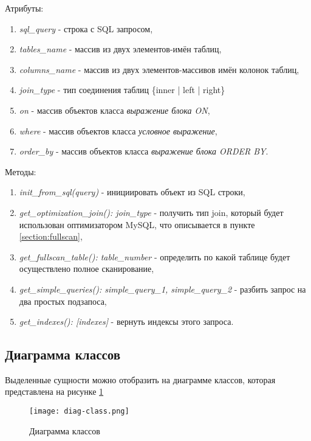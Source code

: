 Атрибуты:
\begin{enumerate}
\item \textit{sql_query} - строка с SQL запросом,
\item \textit{tables_name} - массив из двух элементов-имён таблиц,
\item \textit{columns_name} - массив из двух элементов-массивов имён колонок таблиц,
\item \textit{join_type} - тип соединения таблиц \{inner | left | right\}
\item \textit{on} - массив объектов класса \textit{выражение блока ON},
\item \textit{where} - массив объектов класса \textit{условное выражение},
\item \textit{order_by} - массив объектов класса \textit{выражение блока ORDER BY}.
\end{enumerate}

Методы:
\begin{enumerate}
\item \textit{init_from_sql(query)} - инициировать объект из SQL строки,
\item \textit{get_optimization_join(): join_type} - получить тип join, который будет использован оптимизатором MySQL, что описывается в пункте \ref{section:fullscan},
\item \textit{get_fullscan_table(): table_number} - определить по какой таблице будет осуществлено полное сканирование,
\item \textit{get_simple_queries(): simple_query_1, simple_query_2} - разбить запрос на два простых подзапоса,
\item \textit{get_indexes(): [indexes]} - вернуть индексы этого запроса.
\end{enumerate}

\subsection{Диаграмма классов}

Выделенные сущности можно отобразить на диаграмме классов, которая представлена на рисунке \ref{img:diag-class}

\begin{figure}[h!]
  \centering
  \texttt{[image: diag-class.png]}
  \caption{Диаграмма классов}
  \label{img:diag-class}
\end{figure}
